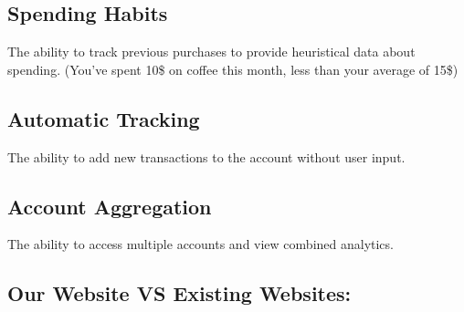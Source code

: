 \documentclass[12pt]{article}
\begin{document}
\subsection{Spending Habits}
The ability to track previous purchases to provide heuristical data about spending. (You've spent 10\$ on coffee this month, less than your average of 15\$)
\subsection{Automatic Tracking}
The ability to add new transactions to the account without user input.
\subsection{Account Aggregation}
The ability to access multiple accounts and view combined analytics.

\pagebreak

\subsection{Our Website VS Existing Websites:}
\end{document}
